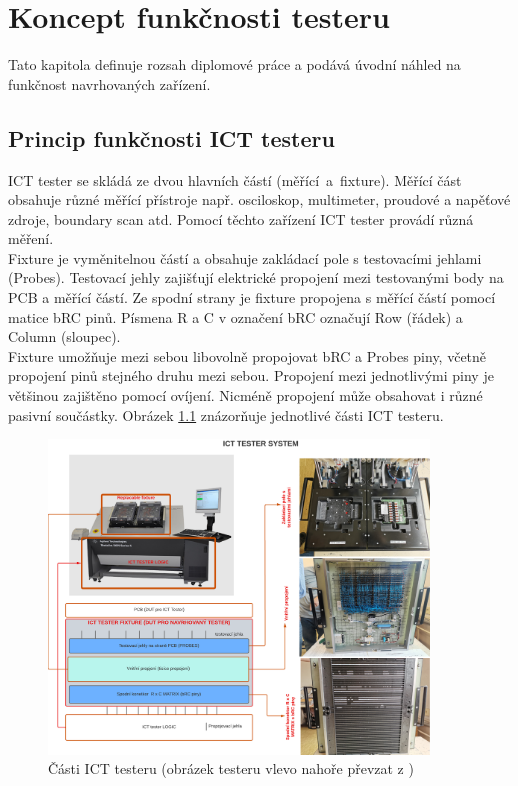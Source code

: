 \chapter{Koncept funkčnosti testeru}
Tato kapitola definuje rozsah diplomové práce a podává úvodní náhled na funkčnost navrhovaných zařízení.

\section{Princip funkčnosti ICT testeru}

    ICT tester se skládá ze dvou hlavních částí \mbox{(měřící a fixture).}
    Měřící část obsahuje různé měřící přístroje např.
    osciloskop, multimeter, proudové a napěťové zdroje, boundary scan atd.
    Pomocí těchto zařízení ICT tester provádí různá měření.\\

    Fixture je vyměnitelnou částí a obsahuje zakládací pole s testovacími jehlami (Probes).
    Testovací jehly zajišťují elektrické propojení mezi testovanými body na PCB a měřící částí.
    Ze spodní strany je fixture propojena s měřící částí pomocí matice bRC pinů.
    Písmena R a C v označení bRC označují Row (řádek) a Column (sloupec).\\

    Fixture umožňuje mezi sebou libovolně propojovat bRC a Probes piny, včetně propojení pinů stejného druhu mezi sebou.
    Propojení mezi jednotlivými piny je většinou zajištěno pomocí ovíjení. Nicméně propojení může obsahovat i různé pasivní součástky.
    Obrázek \ref{fig:ICT_tester} znázorňuje jednotlivé části ICT testeru\cite{ICTkeysight}\cite{ICT_picture}.

\begin{figure}[ht]
\centering
\includegraphics[width=0.9\textwidth]{obrazky/ICT_tester.png}
\caption{Části ICT testeru (obrázek testeru vlevo nahoře převzat z \cite{ICT_picture})}
\label{fig:ICT_tester}
\end{figure}
\clearpage

